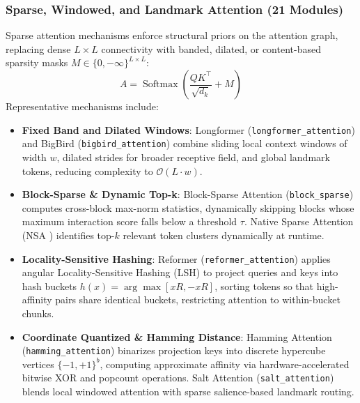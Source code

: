 \documentclass{article}
\begin{document}
\subsubsection{Sparse, Windowed, and Landmark Attention (21 Modules)}
Sparse attention mechanisms enforce structural priors on the attention graph, replacing dense $L \times L$ connectivity with banded, dilated, or content-based sparsity masks $M \in \{0, -\infty\}^{L \times L}$:
\begin{equation}
    A = \operatorname{Softmax}\left(\frac{Q K^\top}{\sqrt{d_k}} + M\right)
\end{equation}
Representative mechanisms include:
\begin{itemize}
    \item \textbf{Fixed Band and Dilated Windows}: Longformer (\texttt{longformer\_attention}) \citep{beltagy2020longformer} and BigBird (\texttt{bigbird\_attention}) \citep{zaheer2020bigbird} combine sliding local context windows of width $w$, dilated strides for broader receptive field, and global landmark tokens, reducing complexity to $\mathcal{O}(L \cdot w)$.
    \item \textbf{Block-Sparse \& Dynamic Top-k}: Block-Sparse Attention (\texttt{block\_sparse}) computes cross-block max-norm statistics, dynamically skipping blocks whose maximum interaction score falls below a threshold $\tau$. Native Sparse Attention (NSA \citep{nsa_2024}) identifies top-$k$ relevant token clusters dynamically at runtime.
    \item \textbf{Locality-Sensitive Hashing}: Reformer (\texttt{reformer\_attention}) \citep{kitaev2020reformer} applies angular Locality-Sensitive Hashing (LSH) to project queries and keys into hash buckets $h(x) = \arg\max [x R, -x R]$, sorting tokens so that high-affinity pairs share identical buckets, restricting attention to within-bucket chunks.
    \item \textbf{Coordinate Quantized \& Hamming Distance}: Hamming Attention (\texttt{hamming\_attention}) \citep{hamming_attention_2024} binarizes projection keys into discrete hypercube vertices $\{-1, +1\}^b$, computing approximate affinity via hardware-accelerated bitwise XOR and popcount operations. Salt Attention (\texttt{salt\_attention}) \citep{salt_2024} blends local windowed attention with sparse salience-based landmark routing.
\end{itemize}
\end{document}
